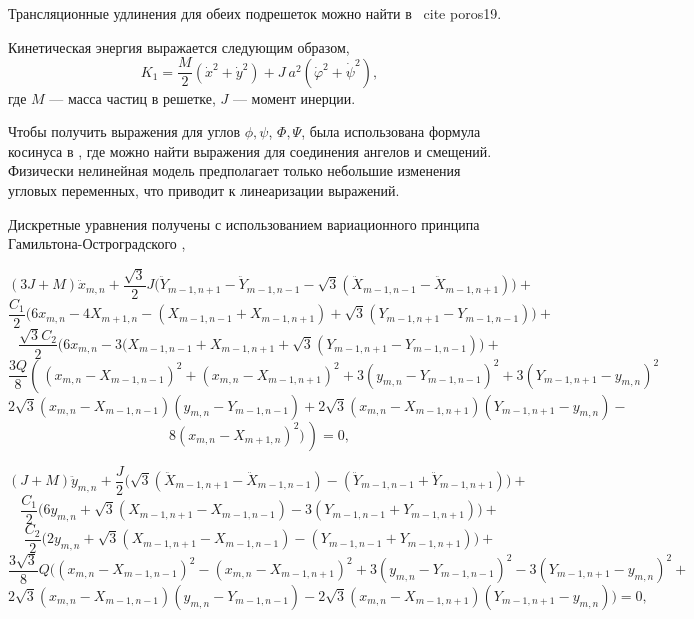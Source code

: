 Трансляционные удлинения для обеих подрешеток можно найти в \ cite {poros19}.

Кинетическая энергия выражается следующим образом,
\begin{equation}
	K_1=\frac{M}{2}\left( \dot{x}^2+\dot{y}^2\right) +J~a^2(\dot{\varphi}^2+\dot{\psi}^2),
\end{equation}
где $M$ --- масса частиц в решетке, $J$ --- момент инерции.

Чтобы получить выражения для углов $\phi, \psi$, $\Phi, \Psi$, была использована формула косинуса в \cite{poros19}, где можно найти выражения для соединения ангелов и смещений. Физически нелинейная модель предполагает только небольшие изменения угловых переменных, что приводит к линеаризации выражений.

Дискретные уравнения получены с использованием вариационного принципа Гамильтона-Остроградского \cite{poros19},

\[
(3J+M)\ddot{x}_{m,n}+\frac{\sqrt{3}}{2}J\Big(\ddot{Y}_{m-1,n+1} - \ddot{Y}_{m-1,n-1} -\sqrt{3}(\ddot{X}_{m-1,n-1} - \ddot{X}_{m-1,n+1})\Big) +
\]
\[
\frac{C_1}{2}\Big(6x_{m,n} - 4X_{m+1,n} - (X_{m-1,n-1} + X_{m-1,n+1}) + \sqrt{3}(Y_{m-1,n+1} - Y_{m-1,n-1})\Big) +
\]
\[
\frac{\sqrt{3}C_2}{2}\Big(6x_{m,n} - 3(X_{m-1,n-1} + X_{m-1,n+1}+\sqrt{3}(Y_{m-1,n+1} - Y_{m-1,n-1})\Big) +
\]
\[
\frac{3Q}{8}\left(\frac{}{}(x_{m,n} - X_{m-1,n-1})^2 + (x_{m,n} - X_{m-1,n+1})^2 +3(y_{m,n} - Y_{m-1,n-1})^2 + 3(Y_{m-1,n+1}-y_{m,n})^2 \right.
\]
\[
\left. 2\sqrt{3} (x_{m,n} - X_{m-1,n-1})(y_{m,n} - Y_{m-1,n-1}) + 2\sqrt{3}(x_{m,n} - X_{m-1,n+1})(Y_{m-1,n+1}-y_{m,n} )-
\right.
\]
\begin{equation}
	\left. 8(x_{m,n}-X_{m+1,n})^2)\frac{}{}\right)=0,
	\label{twod_goveq1}
\end{equation}

\[
(J+M)\ddot{y}_{m,n}+\frac{J}{2}\Big(\sqrt{3}(\ddot{X}_{m-1,n+1} - \ddot{X}_{m-1,n-1}) - (\ddot{Y}_{m-1,n-1} + \ddot{Y}_{m-1,n+1}) \Big) +
\]
\[
\frac{C_1}{2}\Big(6y_{m,n} + \sqrt{3}(X_{m-1,n+1} - X_{m-1,n-1}) - 3(Y_{m-1,n-1} + Y_{m-1,n+1})\Big) +
\]
\[
\frac{C_2}{2}\Big(2y_{m,n}+\sqrt{3}(X_{m-1,n+1} - X_{m-1,n-1}) - (Y_{m-1,n-1} + Y_{m-1,n+1})\Big) +
\]
\[
\frac{3\sqrt{3}}{8}Q\Big((x_{m,n} - X_{m-1,n-1})^2 - (x_{m,n} - X_{m-1,n+1})^2 +3(y_{m,n} - Y_{m-1,n-1})^2 - 3(Y_{m-1,n+1}-y_{m,n})^2 +
\]
\begin{equation}
	2\sqrt{3}(x_{m,n} - X_{m-1,n-1})(y_{m,n} - Y_{m-1,n-1}) - 2\sqrt{3}(x_{m,n} - X_{m-1,n+1})(Y_{m-1,n+1}-y_{m,n})\Big)=0,
	\label{twod_goveq2}
\end{equation}

